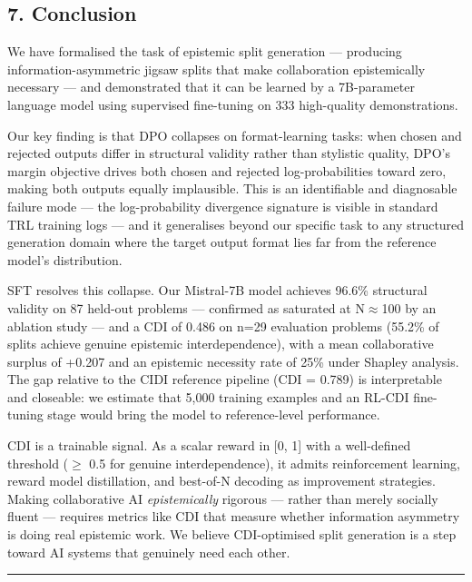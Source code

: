 \documentclass[
  11pt,
]{article}
\begin{document}
\subsection{7. Conclusion}\label{conclusion}

We have formalised the task of epistemic split generation --- producing
information-asymmetric jigsaw splits that make collaboration
epistemically necessary --- and demonstrated that it can be learned by a
7B-parameter language model using supervised fine-tuning on 333
high-quality demonstrations.

Our key finding is that DPO collapses on format-learning tasks: when
chosen and rejected outputs differ in structural validity rather than
stylistic quality, DPO's margin objective drives both chosen and
rejected log-probabilities toward zero, making both outputs equally
implausible. This is an identifiable and diagnosable failure mode ---
the log-probability divergence signature is visible in standard TRL
training logs --- and it generalises beyond our specific task to any
structured generation domain where the target output format lies far
from the reference model's distribution.

SFT resolves this collapse. Our Mistral-7B model achieves 96.6\%
structural validity on 87 held-out problems --- confirmed as saturated
at N$\approx$100 by an ablation study --- and a CDI of 0.486 on n=29 evaluation
problems (55.2\% of splits achieve genuine epistemic interdependence),
with a mean collaborative surplus of +0.207 and an epistemic necessity
rate of 25\% under Shapley analysis. The gap relative to the CIDI
reference pipeline (CDI = 0.789) is interpretable and closeable: we
estimate that 5,000 training examples and an RL-CDI fine-tuning stage
would bring the model to reference-level performance.

CDI is a trainable signal. As a scalar reward in {[}0, 1{]} with a
well-defined threshold ($\geq$ 0.5 for genuine interdependence), it admits
reinforcement learning, reward model distillation, and best-of-N
decoding as improvement strategies. Making collaborative AI
\emph{epistemically} rigorous --- rather than merely socially fluent ---
requires metrics like CDI that measure whether information asymmetry is
doing real epistemic work. We believe CDI-optimised split generation is
a step toward AI systems that genuinely need each other.

\begin{center}\rule{0.5\linewidth}{0.5pt}\end{center}
\end{document}
